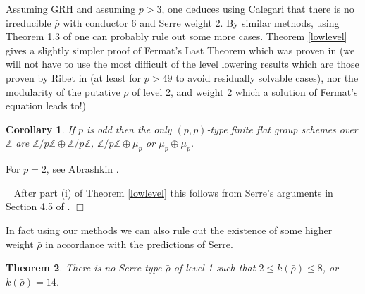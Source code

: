 \documentclass[12pt]{article}
\newcommand{\Z}{\mathbb{Z}}
\newtheorem{theorem}{Theorem}[section]
\newtheorem{cor}[theorem]{Corollary}
\newenvironment{proof}{\smallskip\noindent{\bf Proof.}\
}{$\Box$\smallskip\goodbreak}
\def\rhob{ {\bar {\rho} } }
\begin{document}
 Assuming GRH and assuming $p>3$,
one deduces using Calegari \cite{Calegari} that there is no irreducible
$\rhob$
with
conductor 6 and Serre weight 2. By similar methods, using
Theorem 1.3 of \cite{Schoof1} one can probably rule out some more
cases.
Theorem
\ref{lowlevel}  gives a slightly simpler proof of Fermat's Last Theorem
which
was proven in \cite{Wiles} (we will not have to use the most difficult of
the
level lowering results which are
those proven by Ribet in \cite{Ribet} (at least for $p>49$ to avoid
residually solvable cases), nor the
modularity
of the putative $\rhob$ of level 2, and weight 2 which a solution of
Fermat's equation leads to!)



\begin{cor}\label{groupschemes}
 If $p$ is odd then the only $(p,p)$-type
 finite flat group schemes over $\Z$ are $\Z/p\Z \oplus \Z/p\Z$,
 $\Z/p\Z \oplus \mu_p$ or $\mu_p \oplus \mu_p$.
\end{cor}

For $p=2$, see Abrashkin \cite{[A89]}.

\begin{proof}
After part (i) of Theorem \ref{lowlevel} this follows from Serre's
arguments in Section 4.5 of
\cite{Serre3}. 
\end{proof}

In fact using our methods we can also rule out the existence of some higher
weight $\rhob$ in accordance with the predictions of Serre.

\begin{theorem}\label{lowweight}
 There is no Serre type $\rhob$ of level 1
such that $2 \leq k(\rhob) \leq 8$, or
 $k(\rhob)= 14$.

\end{theorem}
\end{document}
